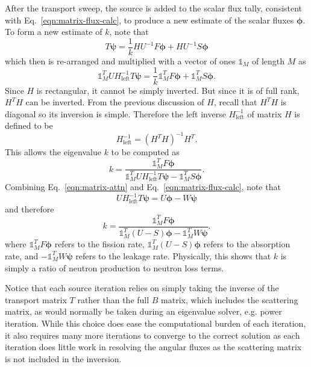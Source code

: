 After the transport sweep, the source is added to the scalar flux tally, consistent with Eq.~\ref{eqn:matrix-flux-calc}, to produce a new estimate of the scalar fluxes $\boldsymbol{\phi}$. To form a new estimate of $k$, note that
\begin{equation}
T \boldsymbol{\psi} = \frac{1}{k} H U^{-1} F \boldsymbol{\phi} + H U^{-1} S \boldsymbol{\phi}
\end{equation}
which then is re-arranged and multiplied with a vector of ones $\mathbb{1}_M$ of length $M$ as
\begin{equation}
\mathbb{1}_M^T U H_{\text{left}}^{-1} T \boldsymbol{\psi}  = \frac{1}{k} \mathbb{1}_M^T  F \boldsymbol{\phi} + \mathbb{1}_M^T  S \boldsymbol{\phi}.
\end{equation}
Since $H$ is rectangular, it cannot be simply inverted. But since it is of full rank, $H^T H$ can be inverted. From the previous discussion of $H$, recall that $H^T H$ is diagonal so its inversion is simple. Therefore the left inverse $H_{\text{left}}^{-1}$ of matrix $H$ is defined to be
\begin{equation}
H_{\text{left}}^{-1} = \left(H^T H\right)^{-1} H^T.
\end{equation}
This allows the eigenvalue $k$ to be computed as
\begin{equation}
k = \frac{\mathbb{1}_M^T F \boldsymbol{\phi}}{\mathbb{1}_M^T  U H_{\text{left}}^{-1} T \boldsymbol{\psi} - \mathbb{1}_M^T S \boldsymbol{\phi}}.
\end{equation}
Combining Eq.~\ref{eqn:matrix-attn} and Eq.~\ref{eqn:matrix-flux-calc}, note that
\begin{equation}
U H_{\text{left}}^{-1} T \boldsymbol{\psi} = U \boldsymbol{\phi} - W \boldsymbol{\psi}
\end{equation}
and therefore
\begin{equation}
k = \frac{\mathbb{1}_M^T F \boldsymbol{\phi}}{\mathbb{1}_M^T \left(U - S \right) \boldsymbol{\phi} - \mathbb{1}_M^T W \boldsymbol{\psi}}.
\end{equation}
where $\mathbb{1}_M^T F \boldsymbol{\phi}$ refers to the fission rate, $\mathbb{1}_M^T \left(U - S \right) \boldsymbol{\phi}$ refers to the absorption rate, and $-\mathbb{1}_M^T W \boldsymbol{\psi}$ refers to the leakage rate. Physically, this shows that $k$ is simply a ratio of neutron production to neutron loss terms.

Notice that each source iteration relies on simply taking the inverse of the transport matrix $T$ rather than the full $B$ matrix, which includes the scattering matrix, as would normally be taken during an eigenvalue solver, e.g. power iteration. While this choice does ease the computational burden of each iteration, it also requires many more iterations to converge to the correct solution as each iteration does little work in resolving the angular fluxes as the scattering matrix is not included in the inversion. 

